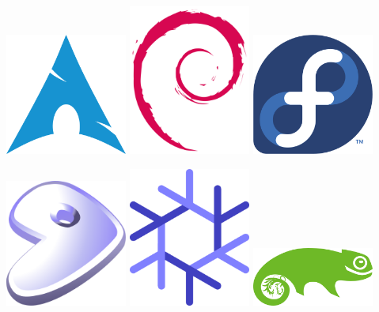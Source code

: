 \begin{frame}
    \frametitle{}

    \begin{center}
        \includegraphics[width=0.3\textwidth]{img/arch.png}
        \includegraphics[width=0.3\textwidth]{img/debian.png}
        \includegraphics[width=0.3\textwidth]{img/fedora.png}

        \includegraphics[width=0.3\textwidth]{img/gentoo.png}
        \includegraphics[width=0.3\textwidth]{img/nixos.png}
        \includegraphics[width=0.3\textwidth]{img/suse.png}
    \end{center}

\end{frame}

